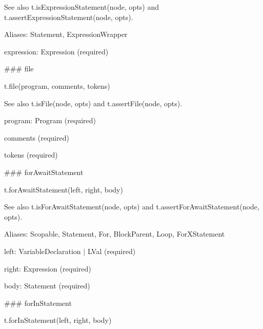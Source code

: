 See also {\ttfamily t.\+is\+Expression\+Statement(node, opts)} and {\ttfamily t.\+assert\+Expression\+Statement(node, opts)}.

Aliases\+: {\ttfamily Statement}, {\ttfamily Expression\+Wrapper}


\begin{DoxyItemize}
\item {\ttfamily expression}\+: {\ttfamily Expression} (required) 


\end{DoxyItemize}

\#\#\# file 
\begin{DoxyCode}
t.file(program, comments, tokens)
\end{DoxyCode}


See also {\ttfamily t.\+is\+File(node, opts)} and {\ttfamily t.\+assert\+File(node, opts)}.


\begin{DoxyItemize}
\item {\ttfamily program}\+: {\ttfamily Program} (required)
\item {\ttfamily comments} (required)
\item {\ttfamily tokens} (required) 


\end{DoxyItemize}

\#\#\# for\+Await\+Statement 
\begin{DoxyCode}
t.forAwaitStatement(left, right, body)
\end{DoxyCode}


See also {\ttfamily t.\+is\+For\+Await\+Statement(node, opts)} and {\ttfamily t.\+assert\+For\+Await\+Statement(node, opts)}.

Aliases\+: {\ttfamily Scopable}, {\ttfamily Statement}, {\ttfamily For}, {\ttfamily Block\+Parent}, {\ttfamily Loop}, {\ttfamily For\+X\+Statement}


\begin{DoxyItemize}
\item {\ttfamily left}\+: {\ttfamily Variable\+Declaration $\vert$ L\+Val} (required)
\item {\ttfamily right}\+: {\ttfamily Expression} (required)
\item {\ttfamily body}\+: {\ttfamily Statement} (required) 


\end{DoxyItemize}

\#\#\# for\+In\+Statement 
\begin{DoxyCode}
t.forInStatement(left, right, body)
\end{DoxyCode}


